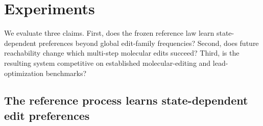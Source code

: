 %
%
%
\section{Experiments}
\label{sec:gem-experiments}

We evaluate three claims. First, does the frozen reference law learn state-dependent preferences beyond global edit-family frequencies? Second, does future reachability change which multi-step molecular edits succeed? Third, is the resulting system competitive on established molecular-editing and lead-optimization benchmarks?

\subsection{The reference process learns state-dependent edit preferences}
\label{sec:gem-exp-rtheta}

